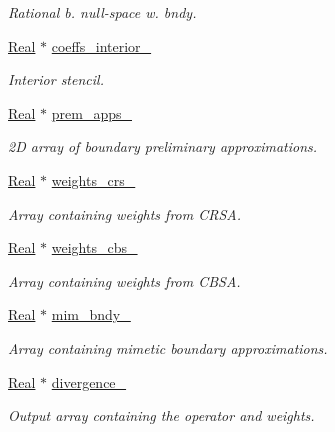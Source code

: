 \begin{DoxyCompactItemize}
\begin{DoxyCompactList}\small\item\em Rational b. null-\/space w. bndy. \end{DoxyCompactList}\item 
\hyperlink{group__c01-roots_gac080bbbf5cbb5502c9f00405f894857d}{Real} $\ast$ \hyperlink{classmtk_1_1Div1D_a7c7688d8ac25120587353ece4e93a13a}{coeffs\+\_\+interior\+\_\+}
\begin{DoxyCompactList}\small\item\em Interior stencil. \end{DoxyCompactList}\item 
\hyperlink{group__c01-roots_gac080bbbf5cbb5502c9f00405f894857d}{Real} $\ast$ \hyperlink{classmtk_1_1Div1D_ab51ff3db86a874604d6c756ab6770950}{prem\+\_\+apps\+\_\+}
\begin{DoxyCompactList}\small\item\em 2\+D array of boundary preliminary approximations. \end{DoxyCompactList}\item 
\hyperlink{group__c01-roots_gac080bbbf5cbb5502c9f00405f894857d}{Real} $\ast$ \hyperlink{classmtk_1_1Div1D_ad36dcfade921f0488fe3edaecc17bd75}{weights\+\_\+crs\+\_\+}
\begin{DoxyCompactList}\small\item\em Array containing weights from C\+R\+S\+A. \end{DoxyCompactList}\item 
\hyperlink{group__c01-roots_gac080bbbf5cbb5502c9f00405f894857d}{Real} $\ast$ \hyperlink{classmtk_1_1Div1D_a631dad42a0ec0f5d5ac767abdfd8949c}{weights\+\_\+cbs\+\_\+}
\begin{DoxyCompactList}\small\item\em Array containing weights from C\+B\+S\+A. \end{DoxyCompactList}\item 
\hyperlink{group__c01-roots_gac080bbbf5cbb5502c9f00405f894857d}{Real} $\ast$ \hyperlink{classmtk_1_1Div1D_a6d6c600117fdb583f061da0c9d5f28f7}{mim\+\_\+bndy\+\_\+}
\begin{DoxyCompactList}\small\item\em Array containing mimetic boundary approximations. \end{DoxyCompactList}\item 
\hyperlink{group__c01-roots_gac080bbbf5cbb5502c9f00405f894857d}{Real} $\ast$ \hyperlink{classmtk_1_1Div1D_a0f96410051ba1fa6d91dfa7b7eacead9}{divergence\+\_\+}
\begin{DoxyCompactList}\small\item\em Output array containing the operator and weights. \end{DoxyCompactList}\item 

\end{DoxyCompactItemize}
